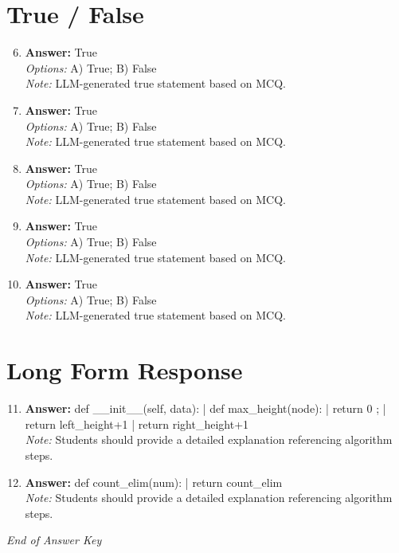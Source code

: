 \documentclass[12pt]{article}
\begin{document}
\section*{True / False}
\begin{enumerate}[label=\arabic*.]
\setcounter{enumi}{5}
\item \textbf{Answer:} True
\\ \textit{Options:} A) True; B) False
\\ \textit{Note:} LLM-generated true statement based on MCQ.
\item \textbf{Answer:} True
\\ \textit{Options:} A) True; B) False
\\ \textit{Note:} LLM-generated true statement based on MCQ.
\item \textbf{Answer:} True
\\ \textit{Options:} A) True; B) False
\\ \textit{Note:} LLM-generated true statement based on MCQ.
\item \textbf{Answer:} True
\\ \textit{Options:} A) True; B) False
\\ \textit{Note:} LLM-generated true statement based on MCQ.
\item \textbf{Answer:} True
\\ \textit{Options:} A) True; B) False
\\ \textit{Note:} LLM-generated true statement based on MCQ.
\end{enumerate}

\section*{Long Form Response}
\begin{enumerate}[label=\arabic*.]
\setcounter{enumi}{10}
\item \textbf{Answer:} def \_\_init\_\_(self, data): | def max\_height(node): | return 0 ; | return left\_height+1 | return right\_height+1
\\ \textit{Note:} Students should provide a detailed explanation referencing algorithm steps.
\item \textbf{Answer:} def count\_elim(num): | return count\_elim
\\ \textit{Note:} Students should provide a detailed explanation referencing algorithm steps.
\end{enumerate}

\vfill
\noindent\textit{End of Answer Key}
\end{document}
